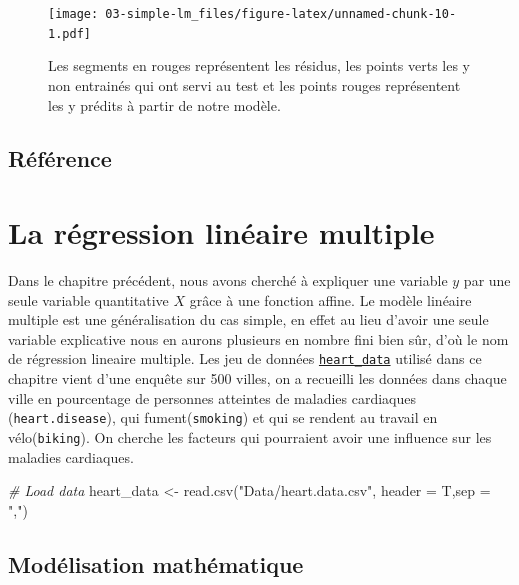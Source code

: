 \documentclass[
]{book}
\newenvironment{Shaded}{\begin{snugshade}}{\end{snugshade}}
\newcommand{\AttributeTok}[1]{\textcolor[rgb]{0.77,0.63,0.00}{#1}}
\newcommand{\CommentTok}[1]{\textcolor[rgb]{0.56,0.35,0.01}{\textit{#1}}}
\newcommand{\FunctionTok}[1]{\textcolor[rgb]{0.00,0.00,0.00}{#1}}
\newcommand{\NormalTok}[1]{#1}
\newcommand{\OtherTok}[1]{\textcolor[rgb]{0.56,0.35,0.01}{#1}}
\newcommand{\StringTok}[1]{\textcolor[rgb]{0.31,0.60,0.02}{#1}}
\begin{document}
\begin{figure}
\centering
\texttt{[image: 03-simple-lm\_files/figure-latex/unnamed-chunk-10-1.pdf]}
\caption{\label{fig:unnamed-chunk-10}Les segments en rouges représentent les résidus, les points verts les y non entrainés qui ont servi au test et les points rouges représentent les y prédits à partir de notre modèle.}
\end{figure}

\hypertarget{ruxe9fuxe9rence}{%
\section*{Référence}\label{ruxe9fuxe9rence}}

\citet{lm_simple}

\hypertarget{multiple-lm}{%
\chapter{La régression linéaire multiple}\label{multiple-lm}}

Dans le chapitre précédent, nous avons cherché à expliquer une variable \(y\) par une seule variable quantitative \(X\) grâce à une fonction affine. Le modèle linéaire multiple est une généralisation du cas simple, en effet au lieu d'avoir une seule variable explicative nous en aurons plusieurs en nombre fini bien sûr, d'où le nom de régression lineaire multiple.
Les jeu de données \href{Data/heart.data.csv}{\texttt{heart\_data}} utilisé dans ce chapitre vient d'une enquête sur 500 villes, on a recueilli les données dans chaque ville en pourcentage de personnes atteintes de maladies cardiaques (\texttt{heart.disease}), qui fument(\texttt{smoking}) et qui se rendent au travail en vélo(\texttt{biking}). On cherche les facteurs qui pourraient avoir une influence sur les maladies cardiaques.

\begin{Shaded}
\begin{Highlighting}[]
\CommentTok{\# Load data}
\NormalTok{heart\_data }\OtherTok{\textless{}{-}} \FunctionTok{read.csv}\NormalTok{(}\StringTok{"Data/heart.data.csv"}\NormalTok{,}
                       \AttributeTok{header =}\NormalTok{ T,}\AttributeTok{sep =} \StringTok{","}\NormalTok{)}
\end{Highlighting}
\end{Shaded}

\hypertarget{moduxe9lisation-mathuxe9matique-1}{%
\section{Modélisation mathématique}\label{moduxe9lisation-mathuxe9matique-1}}
\end{document}

